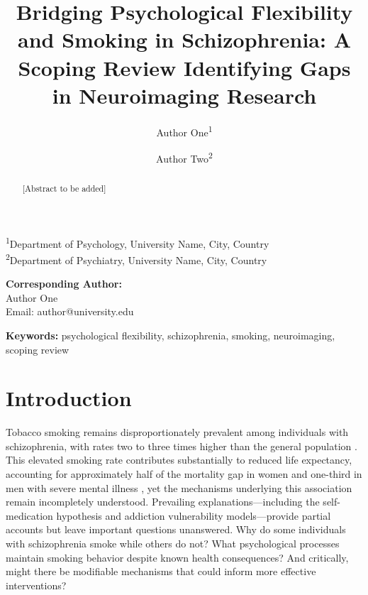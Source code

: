 \documentclass[12pt]{article}
\begin{document}
\title{Bridging Psychological Flexibility and Smoking in Schizophrenia: A Scoping Review Identifying Gaps in Neuroimaging Research}

\author{
    Author One\textsuperscript{1} \and
    Author Two\textsuperscript{2}
}

\date{}
\maketitle

\begin{center}
\textsuperscript{1}Department of Psychology, University Name, City, Country\\
\textsuperscript{2}Department of Psychiatry, University Name, City, Country
\end{center}

\vspace{1cm}

\textbf{Corresponding Author:}\\
Author One\\
Email: author@university.edu

\newpage

\begin{abstract}
[Abstract to be added]
\end{abstract}

\textbf{Keywords:} psychological flexibility, schizophrenia, smoking, neuroimaging, scoping review

\newpage

\section{Introduction}

Tobacco smoking remains disproportionately prevalent among individuals with schizophrenia, with rates two to three times higher than the general population \citep{deleon2005}. This elevated smoking rate contributes substantially to reduced life expectancy, accounting for approximately half of the mortality gap in women and one-third in men with severe mental illness \citep{chang2022}, yet the mechanisms underlying this association remain incompletely understood. Prevailing explanations---including the self-medication hypothesis \citep{winterer2010} and addiction vulnerability models---provide partial accounts but leave important questions unanswered. Why do some individuals with schizophrenia smoke while others do not? What psychological processes maintain smoking behavior despite known health consequences? And critically, might there be modifiable mechanisms that could inform more effective interventions?
\end{document}
